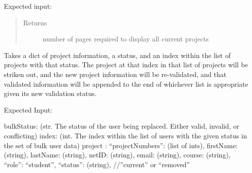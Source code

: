 \documentclass[letterpaper,10pt,english]{sphinxmanual}
\begin{document}
\begin{fulllineitems}
\begin{fulllineitems}
Expected input:

\begin{sphinxVerbatim}[commandchars=\\\{\}]
        
               
\end{sphinxVerbatim}
\begin{quote}\begin{description}
\item[{Returns}] \leavevmode
number of pages required to display all current projects

\end{description}\end{quote}

\end{fulllineitems}


\begin{fulllineitems}
\label{\detokenize{apidoc/utdesign_procurement:utdesign_procurement.apigateway.ApiGateway.projectSpreadsheetRevalidate}}
Takes a dict of project information, a status, and an index within the
list of projects with that status. The project at that index in that list
of projects will be striken out, and the new project information will be
re-validated, and that validated information will be appended to the
end of whichever list is appropriate given its new validation
status.

Expected Input:

\begin{sphinxVerbatim}[commandchars=\\\{\}]
\PYGZob{}
    \PYGZdq{}bulkStatus\PYGZdq{}: (str. The status of the user being replaced.
        Either \PYGZdq{}valid\PYGZdq{}, \PYGZdq{}invalid\PYGZdq{}, or \PYGZdq{}conflicting\PYGZdq{})
    \PYGZdq{}index\PYGZdq{}: (int. The index within the list of users with
        the given status in the set of bulk user data)
    \PYGZdq{}project\PYGZdq{} :  \PYGZob{}
        “projectNumbers”: (list of ints),
        \PYGZdq{}firstName\PYGZdq{}: (string),
        \PYGZdq{}lastName\PYGZdq{}: (string),
        \PYGZdq{}netID\PYGZdq{}: (string),
        \PYGZdq{}email\PYGZdq{}: (string),
        \PYGZdq{}course\PYGZdq{}: (string),
        “role”: “student”,
        “status”: (string), //”current” or “removed”
    \PYGZcb{}
\PYGZcb{}
\end{sphinxVerbatim}


\end{fulllineitems}
\end{fulllineitems}
\end{document}
